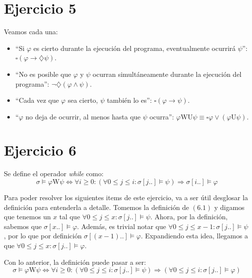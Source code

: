 \documentclass{article}
\begin{document}
\section*{Ejercicio 5}
Veamos cada una:
\begin{itemize}
	\item ``Si $\varphi$ es cierto durante la ejecución del programa, eventualmente ocurrirá $\psi$'': $\square(\varphi \to \diamondsuit\psi)$.
	\item ``No es posible que $\varphi$ y $\psi$ ocurran simultáneamente durante la ejecución del programa'': $\neg\diamondsuit(\varphi \land \psi)$.
	\item ``Cada vez que $\varphi$ sea cierto, $\psi$ también lo es'': $\square(\varphi \to \psi)$.
	\item ``$\varphi$ no deja de ocurrir, al menos hasta que $\psi$ ocurra'': $\varphi \text{WU} \psi \equiv \square\varphi \lor (\varphi \text{U} \psi)$.
\end{itemize}

\section*{Ejercicio 6}
Se define el operador \textit{while} como:
\begin{equation*}
	\tag*{(6.1)}
	\sigma \vDash \varphi \text{W} \psi \iff \forall i \geq 0 : (\forall 0 \leq j \leq i : \sigma[j..] \vDash \psi) \Rightarrow \sigma[i..] \vDash \varphi
\end{equation*}

Para poder resolver los siguientes items de este ejercicio, va a ser útil desglosar la definición para entenderla a detalle.
Tomemos la definición de $(6.1)$ y digamos que tenemos un $x$ tal que $\forall 0 \leq j \leq x : \sigma[j..] \vDash \psi$.
Ahora, por la definición, sabemos que $\sigma[x..] \vDash \varphi$.
Además, es trivial notar que $\forall 0 \leq j \leq x-1 : \sigma[j..] \vDash \psi$, por lo que por definición $\sigma[(x-1)..] \vDash \varphi$.
Expandiendo esta idea, llegamos a que $\forall 0 \leq j \leq x : \sigma[j..] \vDash \varphi$.

Con lo anterior, la definición puede pasar a ser:
\begin{equation*}
	\tag*{(6.2)}
	\sigma \vDash \varphi \text{W} \psi \iff \forall i \geq 0 : (\forall 0 \leq j \leq i : \sigma[j..] \vDash \psi) \Rightarrow (\forall 0 \leq j \leq i : \sigma[j..] \vDash \varphi)
\end{equation*}
\end{document}
